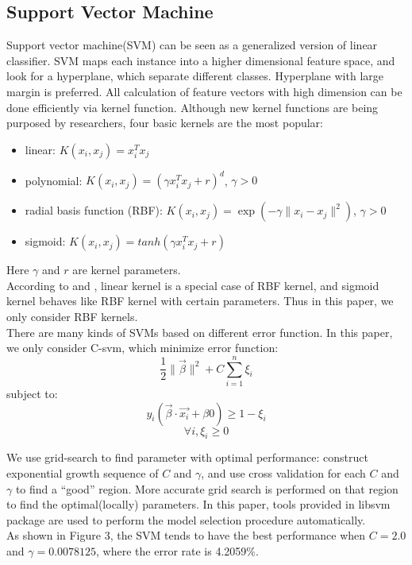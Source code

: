 \documentclass[a4paper,11pt]{article}
\begin{document}
\subsection{Support Vector Machine}
Support vector machine(SVM) can be seen as a generalized version of linear classifier. SVM maps each instance into a higher dimensional feature space, and look for a hyperplane, which separate different classes. Hyperplane with large margin is preferred. All calculation of feature vectors with high dimension can be done efficiently via kernel function. Although new kernel functions are being purposed by researchers, four basic kernels are the most popular\cite{svm}:
\begin{itemize}
\item linear: $K(x_i,x_j)=x_i^Tx_j$\\
\item polynomial: $K(x_i,x_j)=(\gamma x_i^Tx_j+r)^d$, $\gamma >0$\\
\item radial basis function (RBF): $K(x_i,x_j)=\exp(-\gamma \|x_i-x_j\|^2)$, $\gamma > 0$\\
\item sigmoid: $K(x_i,x_j)=tanh(\gamma x_i^Tx_j+r)$\\
\end{itemize}
Here $\gamma$ and $r$ are kernel parameters.\\
According to \cite{ssk} and \cite{ll}, linear kernel is a special case of RBF kernel, and sigmoid kernel behaves like RBF kernel with certain parameters. Thus in this paper, we only consider RBF kernels.\\
There are many kinds of SVMs based on different error function. In this paper, we only consider C-svm, which minimize error function:
    $$\frac{1}{2}\|\vec{\beta}\|^2+C\sum_{i=1}^n \xi_i$$
 subject to:$$y_i(\vec{\beta}\cdot \vec{x_i}+\beta{0})\geq 1-\xi_i$$$$\forall i, \xi_i\geq 0$$

 We use grid-search\cite{svm} to find parameter with optimal performance: construct exponential growth sequence of $C$ and $\gamma$, and use cross validation for each $C$ and $\gamma$ to find a ``good'' region. More accurate grid search is performed on that region to find the optimal(locally) parameters. In this paper, tools provided in libsvm\cite{libsvm} package are used to perform the model selection procedure automatically.\\
As shown in Figure 3, the SVM tends to have the best performance when $C=2.0$ and $\gamma=0.0078125$, where the error rate is 4.2059\%.
\end{document}
